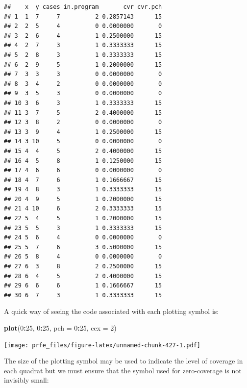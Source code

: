 \documentclass[12pt,a4paper]{book}
\newenvironment{Shaded}{\begin{snugshade}}{\end{snugshade}}
\newcommand{\KeywordTok}[1]{\textcolor[rgb]{0.13,0.29,0.53}{\textbf{#1}}}
\newcommand{\DataTypeTok}[1]{\textcolor[rgb]{0.13,0.29,0.53}{#1}}
\newcommand{\DecValTok}[1]{\textcolor[rgb]{0.00,0.00,0.81}{#1}}
\newcommand{\StringTok}[1]{\textcolor[rgb]{0.31,0.60,0.02}{#1}}
\newcommand{\OperatorTok}[1]{\textcolor[rgb]{0.81,0.36,0.00}{\textbf{#1}}}
\newcommand{\NormalTok}[1]{#1}
\theoremstyle{definition}
\theoremstyle{definition}
\theoremstyle{definition}
\theoremstyle{remark}
\begin{document}
\begin{verbatim}
##    x  y cases in.program       cvr cvr.pch
## 1  1  7     7          2 0.2857143      15
## 2  2  5     4          0 0.0000000       0
## 3  2  6     4          1 0.2500000      15
## 4  2  7     3          1 0.3333333      15
## 5  2  8     3          1 0.3333333      15
## 6  2  9     5          1 0.2000000      15
## 7  3  3     3          0 0.0000000       0
## 8  3  4     2          0 0.0000000       0
## 9  3  5     3          0 0.0000000       0
## 10 3  6     3          1 0.3333333      15
## 11 3  7     5          2 0.4000000      15
## 12 3  8     2          0 0.0000000       0
## 13 3  9     4          1 0.2500000      15
## 14 3 10     5          0 0.0000000       0
## 15 4  4     5          2 0.4000000      15
## 16 4  5     8          1 0.1250000      15
## 17 4  6     6          0 0.0000000       0
## 18 4  7     6          1 0.1666667      15
## 19 4  8     3          1 0.3333333      15
## 20 4  9     5          1 0.2000000      15
## 21 4 10     6          2 0.3333333      15
## 22 5  4     5          1 0.2000000      15
## 23 5  5     3          1 0.3333333      15
## 24 5  6     4          0 0.0000000       0
## 25 5  7     6          3 0.5000000      15
## 26 5  8     4          0 0.0000000       0
## 27 6  3     8          2 0.2500000      15
## 28 6  4     5          2 0.4000000      15
## 29 6  6     6          1 0.1666667      15
## 30 6  7     3          1 0.3333333      15
\end{verbatim}

A quick way of seeing the code associated with each plotting symbol is:

\begin{Shaded}
\begin{Highlighting}[]
\KeywordTok{plot}\NormalTok{(}\DecValTok{0}\OperatorTok{:}\DecValTok{25}\NormalTok{, }\DecValTok{0}\OperatorTok{:}\DecValTok{25}\NormalTok{, }\DataTypeTok{pch =} \DecValTok{0}\OperatorTok{:}\DecValTok{25}\NormalTok{, }\DataTypeTok{cex =} \DecValTok{2}\NormalTok{)}
\end{Highlighting}
\end{Shaded}

\texttt{[image: prfe\_files/figure-latex/unnamed-chunk-427-1.pdf]}

The size of the plotting symbol may be used to indicate the level of
coverage in each quadrat but we must ensure that the symbol used for
zero-coverage is not invisibly small:

\begin{Shaded}
\end{Shaded}
\end{document}
